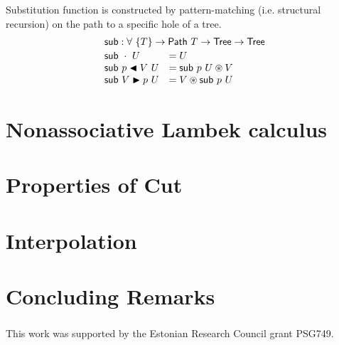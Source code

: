 \documentclass[runningheads]{llncs}
\newcommand{\cdast}{\circledast}
\newcommand{\btleft}{\blacktriangleleft}
\newcommand{\btright}{\blacktriangleright}
\newcommand{\Tree}{\mathsf{Tree}}
\newcommand{\path}[1]{\mathsf{Path} ~ #1}
\newcommand{\Sub}{\mathsf{sub}}
\newcommand{\sub}[2]{\mathsf{sub} ~ #1 ~ #2}
\begin{document}
Substitution function is constructed by pattern-matching (i.e. structural recursion) on the path to a specific hole of a tree.
\[
\begin{array}{ll}
  \multicolumn{2}{l}{\Sub : \forall ~ \{T\} \to \path{T} \to \Tree \to \Tree}
  \\[2pt]
  \sub{\cdot}{U} &= U
  \\
  \sub{p \btleft V}{U} &= \sub{p}{U} \cdast V
  \\
  \sub{V \btright p}{U} &= V \cdast \sub{p}{U} 
\end{array}
\]


\section{Nonassociative Lambek calculus}\label{sec:calculus}

\section{Properties of Cut}

\section{Interpolation}

\section{Concluding Remarks}

\begin{credits}
\subsubsection{\ackname} This work was supported by the Estonian Research Council grant PSG749. 

\end{credits}
%
%
%


%
\end{document}
